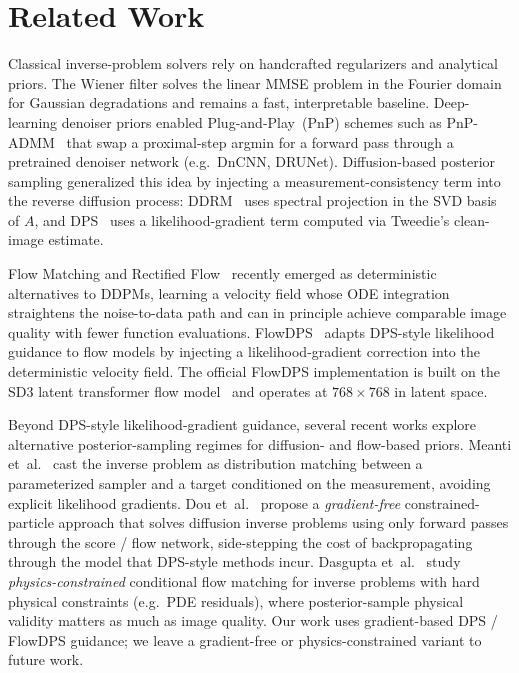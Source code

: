 \documentclass{article}
\begin{document}
\section{Related Work}\label{sec:related}


Classical inverse-problem solvers rely on handcrafted regularizers and
analytical priors. The Wiener filter solves the linear MMSE problem in
the Fourier domain for Gaussian degradations and remains a fast,
interpretable baseline. Deep-learning denoiser priors enabled
Plug-and-Play~(PnP) schemes such as PnP-ADMM~\cite{chan2017pnp,zhang2017dncnn}
that swap a proximal-step argmin for a forward pass through a pretrained
denoiser network (e.g.~DnCNN, DRUNet). Diffusion-based posterior sampling
generalized this idea by injecting a measurement-consistency term into
the reverse diffusion process: DDRM~\cite{kawar2022ddrm} uses spectral
projection in the SVD basis of $A$, and DPS~\cite{chung2023dps} uses a
likelihood-gradient term computed via Tweedie's clean-image estimate.

Flow Matching and Rectified Flow~\cite{lipman2023flow,liu2023rectified}
recently emerged as deterministic alternatives to DDPMs, learning a
velocity field whose ODE integration straightens the noise-to-data path
and can in principle achieve comparable image quality with fewer
function evaluations. FlowDPS~\cite{kim2025flowdps} adapts DPS-style
likelihood guidance to flow models by injecting a likelihood-gradient
correction into the deterministic velocity field. The official FlowDPS
implementation is built on the SD3 latent transformer flow
model~\cite{esser2024sd3} and operates at $768 \times 768$ in latent
space.

Beyond DPS-style likelihood-gradient guidance, several recent works
explore alternative posterior-sampling regimes for diffusion- and
flow-based priors. Meanti et~al.~\cite{meanti2025dim} cast the
inverse problem as distribution matching between a parameterized
sampler and a target conditioned on the measurement, avoiding explicit
likelihood gradients. Dou et~al.~\cite{dou2026particle} propose a
\emph{gradient-free} constrained-particle approach that solves
diffusion inverse problems using only forward passes through the
score / flow network, side-stepping the cost of backpropagating through
the model that DPS-style methods incur. Dasgupta et~al.~\cite{dasgupta2026pcfm}
study \emph{physics-constrained} conditional flow matching for inverse
problems with hard physical constraints (e.g.\ PDE residuals), where
posterior-sample physical validity matters as much as image quality.
Our work uses gradient-based DPS / FlowDPS guidance; we leave a
gradient-free or physics-constrained variant to future work.
\end{document}
